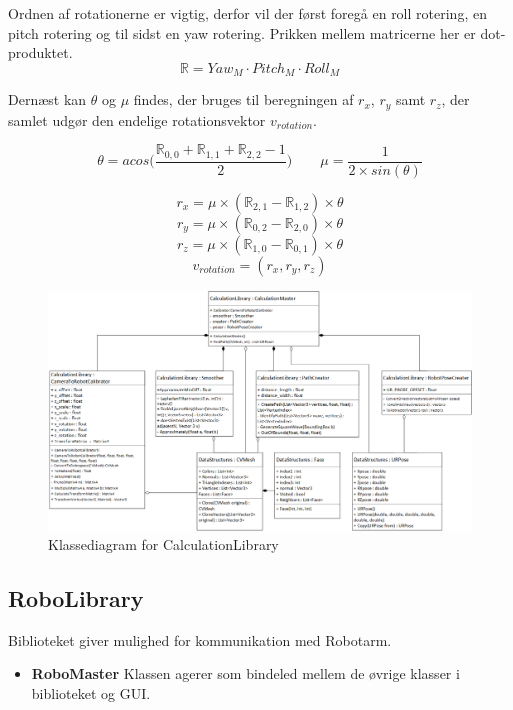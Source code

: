 {\begin{itemize}
Ordnen af rotationerne er vigtig, derfor vil der først foregå en roll rotering, en pitch rotering og til sidst en yaw rotering. Prikken mellem matricerne her er dot-produktet.
$$\mathbb{R} = Yaw_M \cdot Pitch_M \cdot Roll_M $$

Dernæst kan $\theta$ og $\mu$ findes, der bruges til beregningen af $r_x$, $r_y$ samt $r_z$, der samlet udgør den endelige rotationsvektor $v_{rotation}$.

$$\theta = acos\bigg(\frac{\mathbb{R}_{0,0}+\mathbb{R}_{1,1}+\mathbb{R}_{2,2}-1}{2}\bigg) \qquad \mu = \frac{1}{2 \times sin(\theta)}$$

$$r_x =\mu \times(\mathbb{R}_{2,1}-\mathbb{R}_{1,2}) \times\theta $$
$$r_y =\mu \times(\mathbb{R}_{0,2}-\mathbb{R}_{2,0}) \times\theta $$
$$r_z =\mu \times(\mathbb{R}_{1,0}-\mathbb{R}_{0,1}) \times\theta $$
$$v_{rotation} = (r_x, r_y, r_z)$$

\end{itemize}

\begin{figure}[H]
    \centering
    \includegraphics[width=1\textwidth]{figurer/d/Design/Class/uml_class_calculationlibrary}
    \caption{Klassediagram for CalculationLibrary}
    \label{class_ConversionLib}
\end{figure}
\newpage

\subsection{RoboLibrary}
Biblioteket giver mulighed for kommunikation med Robotarm.

\begin{itemize}
\item{\textbf{RoboMaster}}\newline
Klassen agerer som bindeled mellem de øvrige klasser i biblioteket og GUI.


\end{itemize}}
